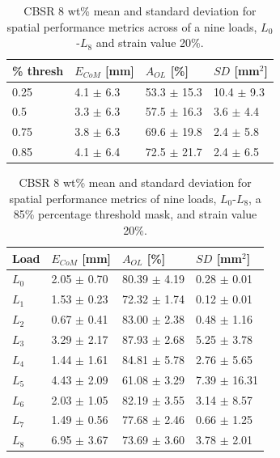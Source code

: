 \begin{table}[H]
    \caption{CBSR 8 wt\% mean and standard deviation for spatial performance metrics across of a nine loads, $L_0$-$L_8$ and strain value 20\%.}
    \label{table:spatial_metrics_stats_8p_strain20}
    \centering
    \begin{tabular}{p{0.7cm}p{2cm}p{2.1cm}p{1.8cm}}
    \hline
        \% thresh & $E_{CoM}$ [mm] & $A_{OL}$ [\%] & $S\!D$ [mm$^2$]\\ \hline
        0.25& 4.1 $\pm$ 6.3& 53.3 $\pm$ 15.3& 10.4 $\pm$ 9.3 \\
        0.5& 3.3 $\pm$ 6.3& 57.5 $\pm$ 16.3& 3.6 $\pm$ 4.4 \\
        0.75& 3.8 $\pm$ 6.3& 69.6 $\pm$ 19.8& 2.4 $\pm$ 5.8 \\
        0.85& 4.1 $\pm$ 6.4& 72.5 $\pm$ 21.7& 2.4 $\pm$ 6.5 \\
        \hline
    \end{tabular}
\end{table}

\begin{table}[H]
    \caption{CBSR 8 wt\% mean and standard deviation for spatial performance metrics of nine loads, $L_0$-$L_8$, a 85\% percentage threshold mask, and strain value 20\%.}
    \label{table:spatial_metrics_stats_8p_strain20_loads}
    \centering
    \begin{tabular}{p{0.7cm}p{2cm}p{2.1cm}p{2.1cm}}
        \hline       
        Load & $E_{CoM}$ [mm] & $A_{OL}$ [\%] & $S\!D$ [mm$^2$]\\ \hline
        $L_0$ & 2.05 $\pm$ 0.70& 80.39 $\pm$ 4.19& 0.28 $\pm$ 0.01\\
        $L_1$& 1.53 $\pm$ 0.23& 72.32 $\pm$ 1.74& 0.12 $\pm$ 0.01\\
        $L_2$& 0.67 $\pm$ 0.41& 83.00 $\pm$ 2.38& 0.48 $\pm$ 1.16\\
        $L_3$& 3.29 $\pm$ 2.17& 87.93 $\pm$ 2.68& 5.25 $\pm$ 3.78\\
        $L_4$& 1.44 $\pm$ 1.61& 84.81 $\pm$ 5.78& 2.76 $\pm$ 5.65\\
        $L_5$& 4.43 $\pm$ 2.09& 61.08 $\pm$ 3.29& 7.39 $\pm$ 16.31\\
        $L_6$& 2.03 $\pm$ 1.05& 82.19 $\pm$ 3.55& 3.14 $\pm$ 8.57\\
        $L_7$& 1.49 $\pm$ 0.56& 77.68 $\pm$ 2.46& 0.66 $\pm$ 1.25\\
        $L_8$& 6.95 $\pm$ 3.67& 73.69 $\pm$ 3.60& 3.78 $\pm$ 2.01\\
        \hline
    \end{tabular}
\end{table}

